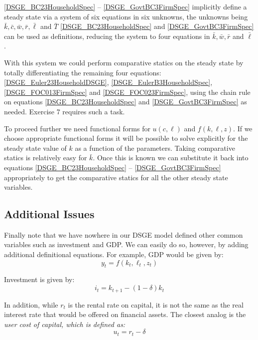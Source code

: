 \documentclass[letterpaper,12pt]{article}
\theoremstyle{definition}
\begin{document}
\begin{spacing}{1.5}
			\eqref{DSGE_BC23HouseholdSpec} -- \eqref{DSGE_GovtBC3FirmSpec} implicitly define a steady state via a system of six equations in six unknowns, the unknowns being $\bar k, \bar c, \bar w, \bar r, \bar \ell$ and $\bar T$ \eqref{DSGE_BC23HouseholdSpec} and \eqref{DSGE_GovtBC3FirmSpec} can be used as definitions, reducing the system to four equations in $\bar k, \bar w, \bar r$ and $ \bar \ell$ .

			With this system we could perform comparative statics on the steady state by totally differentiating the remaining four equations: \eqref{DSGE_Euler23HouseholdDSGE}, \eqref{DSGE_EulerB3HouseholdSpec}, \eqref{DSGE_FOC013FirmSpec} and \eqref{DSGE_FOC023FirmSpec}, using the chain rule on equations \eqref{DSGE_BC23HouseholdSpec} and \eqref{DSGE_GovtBC3FirmSpec} as needed. Exercise 7 requires such a task.

			To proceed further we need functional forms for $u(c,\ell)$ and $f(k,\ell,z)$. If we choose appropriate functional forms it will be possible to solve explicitly for the steady state value of $k$ as a function of the parameters. Taking comparative statics is relatively easy for $\bar k$. Once this is known we can substitute it back into equations \eqref{DSGE_BC23HouseholdSpec} -- \eqref{DSGE_GovtBC3FirmSpec} appropriately to get the comparative statics for all the other steady state variables.

	\subsection{Additional Issues}\label{DSGE_AdditionSpec}
		Finally note that we have nowhere in our DSGE model defined other common variables such as investment and GDP. We can easily do so, however, by adding additional definitional equations. For example, GDP would be given by:
		\begin{equation}
		y_t = f(k_t,\ell_t,z_t)
		\end{equation}

		Investment is given by:
		\begin{equation}
		i_t =k_{t+1} - (1-\delta)k_t
		\end{equation}

		In addition, while $r_t$ is the rental rate on capital, it is not the same as the real interest rate that would be offered on financial assets. The closest analog is the \it user cost of capital\rm, which is defined as:
		\begin{equation}
		u_t = r_t - \delta
		\end{equation}


\end{spacing}
\end{document}

